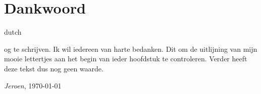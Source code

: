 \chapter*{Dankwoord}
\label{dankwoord}
\fancyhead[RO]{\thepage}
\fancyhead[LE]{\thepage}
\begin{otherlanguage*}{dutch}

\lettrine{}{}og te schrijven. Ik wil iedereen van harte bedanken. Dit om de uitlijning van mijn mooie lettertjes aan het begin van ieder hoofdstuk te controleren. Verder heeft deze tekst dus nog geen waarde.


\hfill \textit{Jeroen}, \today
\end{otherlanguage*}
